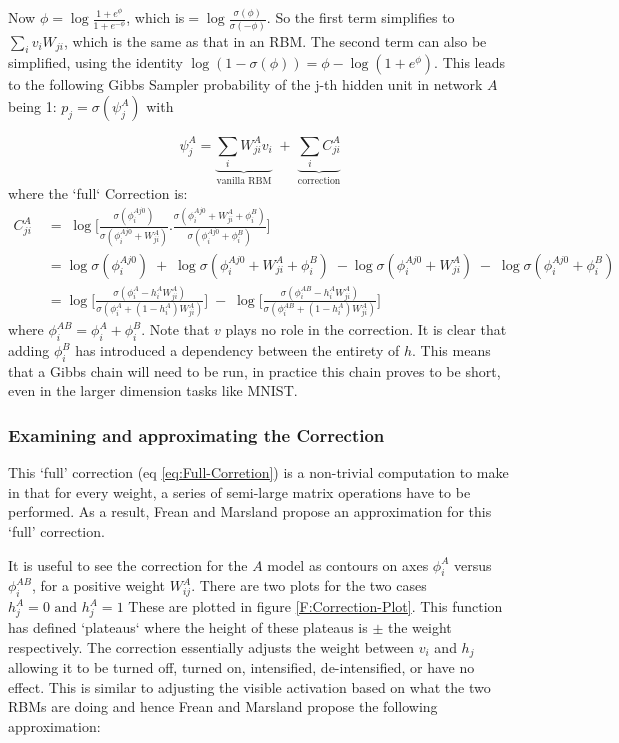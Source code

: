 Now $\phi = \log \frac{1+e^{\phi}}{1+e^{-\phi}}$, which is$ = \log \frac{\sigma(\phi)}{\sigma(-\phi)}$.
So the first term simplifies to
$ \sum_i v_i W_{ji}$, which is the same as that in an RBM. The second term can also be simplified, using the identity $\log(1-\sigma(\phi)) = \phi - \log(1+e^\phi)$. This leads to the following Gibbs Sampler probability of the j-th hidden unit in network $A$ being 1: $p_j = \sigma(\psi_j^A)$ with

$$
\psi_j^A = \underbrace{\sum_i W^A_{ji} v_i}_\text{vanilla RBM} \; + \; \underbrace{\sum_i C^A_{ji}}_\text{correction} $$
where the `full` Correction is:
\begin{equation}\label{eq:Full-Corretion}
\begin{aligned}
C^A_{ji} \; &= \;\log \bigg[ \frac{\sigma (\phi_i^{Aj0})}{\sigma (\phi_i^{Aj0} + W^A_{ji})} . \frac{\sigma (\phi_i^{Aj0} + W_{ji}^A + \phi_i^B) }{\sigma (\phi_i^{Aj0} + \phi_i^B)} \bigg]
\\
&= \log \sigma(\phi_i^{Aj0})  \; + \; \log \sigma (\phi_i^{Aj0} + W^A_{ji} + \phi_i^B) \;- \log \sigma (\phi_i^{Aj0} + W^A_{ji})  \; - \; \log \sigma ( \phi_i^{Aj0} + \phi_i^B)
\\
&= \log \bigg[ \frac{\sigma(\phi_i^{A} - h^A_i W^A_{ji})}{\sigma (\phi_i^{A} + (1-h^A_i) W^A_{ji})} \bigg]  \; - \; \log \bigg[ \frac{ \sigma ( \phi_i^{AB} - h^A_i W^A_{ji})}{\sigma (\phi_i^{AB} + (1-h^A_i) W^A_{ji})} \bigg]
\end{aligned}
\end{equation}
where $\phi_i^{AB} = \phi_i^{A} + \phi_i^{B}$. Note that $v$ plays no role in the correction. It is clear that adding $\phi^B_i$ has introduced a dependency between the entirety of $h$. This means that a Gibbs chain will need to be run, in practice this chain proves to be short, even in the larger dimension tasks like MNIST.

\subsubsection{Examining and approximating the Correction}

This `full' correction (eq \ref{eq:Full-Corretion}) is a non-trivial computation to make in that for every weight, a series of semi-large matrix operations have to be performed. As a result, Frean and Marsland propose an approximation for this `full' correction.

It is useful to see the correction for the $A$ model as contours on axes $\phi^A_i$ versus $\phi^{AB}_i$, for a positive weight $W^A_{ij}$.
There are two plots for the two cases $h^A_j=0 \text{ and } h^A_j = 1$ These are plotted in figure \ref{F:Correction-Plot}. This function has defined `plateaus` where the height of these plateaus is $\pm $ the weight respectively. The correction essentially adjusts the weight between $v_i$ and $h_j$ allowing it to be turned off, turned on, intensified, de-intensified, or have no effect. This is similar to adjusting the visible activation based on what the two RBMs are doing and hence Frean and Marsland propose the following approximation:


